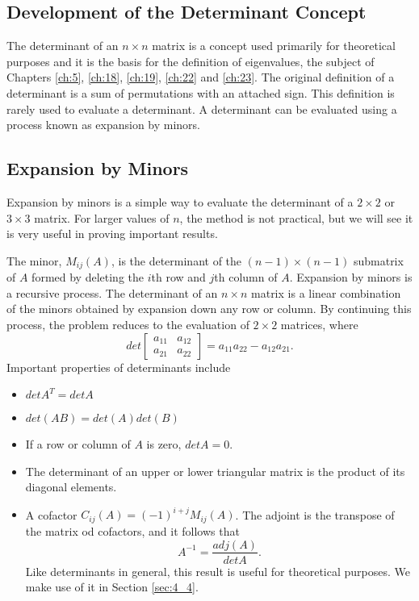 \documentclass[../main.tex]{subfiles}
\begin{document}
\subsection*{Development of the Determinant Concept}
\noindent The determinant of an \(n \times n\) matrix is a concept used primarily for theoretical purposes and it is the basis for the definition of eigenvalues, the subject of Chapters \ref{ch:5}, \ref{ch:18}, \ref{ch:19}, \ref{ch:22} and \ref{ch:23}. The original definition of a determinant is a sum of permutations with an attached sign. This definition is rarely used to evaluate a determinant. A determinant can be evaluated using a process known as expansion by minors.

\subsection*{Expansion by Minors}
\noindent Expansion by minors is a simple way to evaluate the determinant of a \(2 \times 2\) or \(3 \times 3\) matrix. For larger values of \(n\), the method is not practical, but we will see it is very useful in proving important results.

The minor, \(M_{ij}(A)\), is the determinant of the \((n-1) \times (n-1)\) submatrix of \(A\) formed by deleting the \(i\)th row and \(j\)th column of \(A\). Expansion by minors is a recursive process. The determinant of an \(n \times n\) matrix is a linear combination of the minors obtained by expansion down any row or column. By continuing this process, the problem reduces to the evaluation of \(2 \times 2\) matrices, where
\begin{equation*}
  det\begin{bmatrix}
    a_{11} & a_{12}\\
    a_{21} & a_{22}
  \end{bmatrix}
  =a_{11}a_{22} - a_{12}a_{21}.
\end{equation*}
Important properties of determinants include \begin{itemize}
  \item \(detA^T = detA\)
  \item \(det(AB) = det(A)det(B)\)
  \item If a row or column of \(A\) is zero, \(detA  = 0\).
  \item The determinant of an upper or lower triangular matrix is the product of its diagonal elements.
  \item A cofactor \(C_{ij}(A) = (-1)^{i+j}M_{ij}(A)\). The adjoint is the transpose of the matrix od cofactors, and it follows that
  \begin{equation*}
    A^{-1} = \frac{adj(A)}{detA}.
  \end{equation*}
  Like determinants in general, this result is useful for theoretical purposes. We make use of it in Section \ref{sec:4_4}.
\end{itemize}
\end{document}

